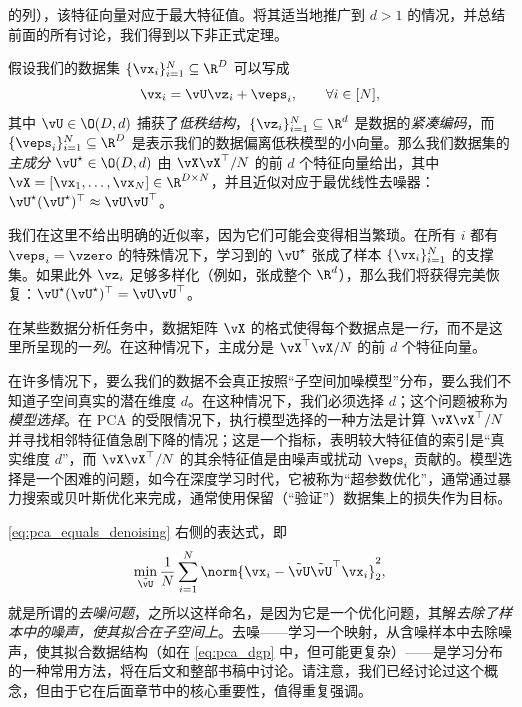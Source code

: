 \documentclass[../../book-main_zh.tex]{subfiles}
\begin{document}
的列），该特征向量对应于最大特征值。将其适当地推广到 \(d > 1\) 的情况，并总结前面的所有讨论，我们得到以下非正式定理。
\begin{theorem}\label{thm:pca}
    假设我们的数据集 \(\{\vx_{i}\}_{i = 1}^{N} \subseteq
    \R^{D}\) 可以写成
    \begin{equation}
        \vx_{i} = \vU\vz_{i} + \veps_{i}, \qquad \forall i \in [N],
    \end{equation}
    其中 \(\vU \in \O(D, d)\) 捕获了\textit{低秩结构}，\(\{\vz_{i}\}_{i =
    1}^{N} \subseteq \R^{d}\) 是数据的\textit{紧凑编码}，而 \(\{\veps_{i}\}_{i
    = 1}^{N} \subseteq \R^{D}\)
    是表示我们的数据偏离低秩模型的小向量。那么我们数据集的\textit{主成分} \(\vU^{\star} \in \O(D,
    d)\) 由 \(\vX\vX^{\top}/N\) 的前 \(d\) 个特征向量给出，其中 \(\vX = [\vx_{1},
        \dots, \vx_{N}] \in \R^{D \times
    N}\)，并且近似对应于最优线性去噪器：\(\vU^{\star}(\vU^{\star})^{\top} \approx
    \vU\vU^{\top}\)。
\end{theorem}
我们在这里不给出明确的近似率，因为它们可能会变得相当繁琐。在所有 \(i\) 都有 \(\veps_{i} = \vzero\)
的特殊情况下，学习到的 \(\vU^{\star}\) 张成了样本 \(\{\vx_{i}\}_{i
= 1}^{N}\) 的支撑集。如果此外 \(\vz_{i}\) 足够多样化（例如，张成整个
\(\R^{d}\)），那么我们将获得完美恢复：\(\vU^{\star}(\vU^{\star})^{\top} = \vU\vU^{\top}\)。

\begin{remark}
    在某些数据分析任务中，数据矩阵 \(\vX\)
    的格式使得每个数据点是一\textit{行}，而不是这里所呈现的一\textit{列}。在这种情况下，主成分是
    \(\vX^{\top}\vX/N\) 的前 \(d\) 个特征向量。
\end{remark}

\begin{remark}[通过去噪特征值进行基选择]
    在许多情况下，要么我们的数据不会真正按照“子空间加噪模型”分布，要么我们不知道子空间真实的潜在维度
    \(d\)。在这种情况下，我们必须选择 \(d\)；这个问题被称为\textit{模型选择}。在 PCA
    的受限情况下，执行模型选择的一种方法是计算 \(\vX\vX^{\top}/N\)
    并寻找相邻特征值急剧下降的情况；这是一个指标，表明较大特征值的索引是“真实维度 \(d\)”，而
    \(\vX\vX^{\top}/N\) 的其余特征值是由噪声或扰动 \(\veps_{i}\)
    贡献的。模型选择是一个困难的问题，如今在深度学习时代，它被称为“超参数优化”，通常通过暴力搜索或贝叶斯优化来完成，通常使用保留（“验证”）数据集上的损失作为目标。
\end{remark}

\begin{remark}[去噪样本]
    \eqref{eq:pca_equals_denoising} 右侧的表达式，即
    \begin{equation}\label{eq:orthogonal_denoising}
        \min_{\tilde{\vU}}\frac{1}{N}\sum_{i = 1}^{N}\norm{\vx_{i} -
        \tilde{\vU}\tilde{\vU}^{\top}\vx_{i}}_{2}^{2},
    \end{equation}
    就是所谓的\textit{去噪问题}，之所以这样命名，是因为它是一个优化问题，其解\textit{去除了样本中的噪声，使其拟合在子空间上}。去噪——学习一个映射，从含噪样本中去除噪声，使其拟合数据结构（如在
    \eqref{eq:pca_dgp}
    中，但可能更复杂）——是学习分布的一种常用方法，将在后文和整部书稿中讨论。请注意，我们已经讨论过这个概念，但由于它在后面章节中的核心重要性，值得重复强调。
\end{remark}
\end{document}
